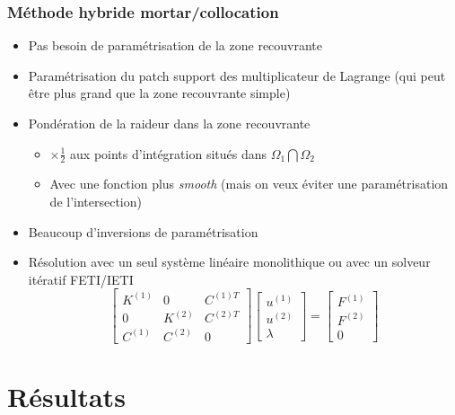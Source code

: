 \documentclass[aspectratio=169]{beamer} %
\begin{document}
\begin{frame}
  \frametitle{Méthode hybride mortar/collocation}
  \begin{itemize}
    \item Pas besoin de paramétrisation de la zone recouvrante
    \item Paramétrisation du patch support des multiplicateur de Lagrange (qui peut être plus grand que la zone recouvrante \faArrowRight{} simple)
    \item Pondération de la raideur dans la zone recouvrante
    \begin{itemize}
      \item $\times \frac{1}{2}$ aux points d'intégration situés dans $\Omega_1 \bigcap \Omega_2$
      \item Avec une fonction plus \textit{smooth} (mais on veux éviter une paramétrisation de l'intersection)
    \end{itemize}
    \item \faWarning{} Beaucoup d'inversions de paramétrisation
    \item Résolution avec un seul système linéaire monolithique ou avec un solveur itératif FETI/IETI
    \begin{equation}
      \begin{bmatrix}
        K^{(1)} & 0 & C^{(1)T} \\
        0 & K^{(2)} & C^{(2)T} \\
        C^{(1)} & C^{(2)} & 0
      \end{bmatrix}
      \begin{bmatrix}
        u^{(1)} \\ u^{(2)} \\ \lambda
      \end{bmatrix}
      =
      \begin{bmatrix}
        F^{(1)} \\ F^{(2)} \\ 0
      \end{bmatrix}
    \end{equation}
  \end{itemize}
\end{frame}

\section*{Résultats}
\end{document}
